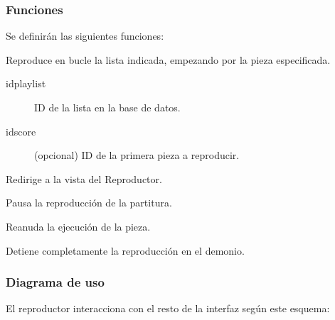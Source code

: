 \smallskip

\subsubsection{Funciones}

Se definirán las siguientes funciones:

\begin{description}[style=nextline]
	\item[play (idplaylist, idscore)]
	Reproduce en bucle la lista indicada, empezando por la pieza especificada.
	
	\begin{description}
		\item[idplaylist] ID de la lista en la base de datos.
		\item[idscore] (opcional) ID de la primera pieza a reproducir.
	\end{description}
	
	Redirige a la vista del Reproductor.
	
	\item[pause ()]
	Pausa la reproducción de la partitura.
	
	\item[resume ()]
	Reanuda la ejecución de la pieza.
	
	\item[stop ()]
	Detiene completamente la reproducción en el demonio.
	
\end{description}

\subsubsection{Diagrama de uso}

El reproductor interacciona con el resto de la interfaz según este esquema:

\smallskip

